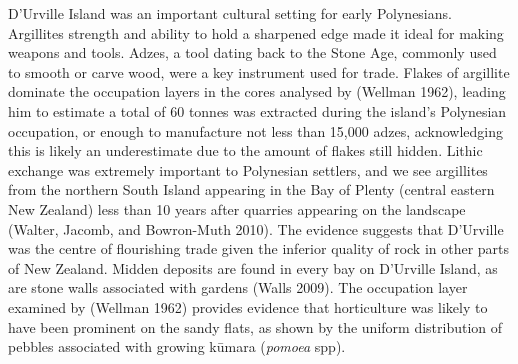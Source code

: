 \documentclass[]{article}
\begin{document}
D'Urville Island was an important cultural setting for early Polynesians. Argillites strength and ability to hold a sharpened edge made it ideal for making weapons and tools. Adzes, a tool dating back to the Stone Age, commonly used to smooth or carve wood, were a key instrument used for trade. Flakes of argillite dominate the occupation layers in the cores analysed by (Wellman 1962), leading him to estimate a total of 60 tonnes was extracted during the island's Polynesian occupation, or enough to manufacture not less than 15,000 adzes, acknowledging this is likely an underestimate due to the amount of flakes still hidden. Lithic exchange was extremely important to Polynesian settlers, and we see argillites from the northern South Island appearing in the Bay of Plenty (central eastern New Zealand) less than 10 years after quarries appearing on the landscape (Walter, Jacomb, and Bowron-Muth 2010). The evidence suggests that D'Urville was the centre of flourishing trade given the inferior quality of rock in other parts of New Zealand. Midden deposits are found in every bay on D'Urville Island, as are stone walls associated with gardens (Walls 2009). The occupation layer examined by (Wellman 1962) provides evidence that horticulture was likely to have been prominent on the sandy flats, as shown by the uniform distribution of pebbles associated with growing kūmara (\emph{pomoea} spp).
\end{document}
